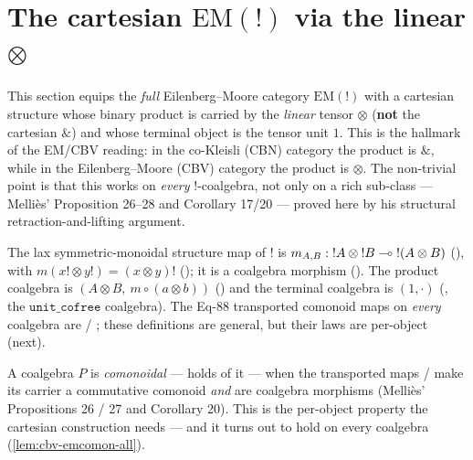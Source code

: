 \section{The cartesian \texorpdfstring{$\mathrm{EM}(\mathord{!})$}{EM(!)} via the linear \texorpdfstring{$\otimes$}{tensor}}\label{sec:cbv-cartesian}

This section equips the \emph{full} Eilenberg--Moore category
$\mathrm{EM}(\mathord{!})$ with a cartesian structure whose binary
product is carried by the \emph{linear} tensor $\otimes$ (\textbf{not} the
cartesian $\mathbin{\&}$) and whose terminal object is the tensor unit
$1$. This is the hallmark of the EM/CBV reading: in the co-Kleisli (CBN)
category the product is $\mathbin{\&}$, while in the Eilenberg--Moore
(CBV) category the product is $\otimes$. The non-trivial point is that
this works on \emph{every} $\mathord{!}$-coalgebra, not only on a rich
sub-class --- Melli\`es' Proposition 26--28 and Corollary 17/20 ---
proved here by his structural retraction-and-lifting argument.

\begin{definition}\label{def:cbv-prod}
\rocqok
{}\rocqok
{}\rocqok
{}
The lax symmetric-monoidal structure map of $\mathord{!}$ is
$m_{A,B} : \mathord{!}A \otimes \mathord{!}B \multimap \mathord{!}(A \otimes B)$
(), with
$m(x! \otimes y!) = (x \otimes y)!$
(); it is a coalgebra morphism
(). The product
coalgebra is $(A \otimes B,\ m \circ (a \otimes b))$
() and the terminal coalgebra is
$(1, \cdot)$ (, the
$\texttt{unit\_cofree}$ coalgebra). The Eq-88 transported comonoid maps
on \emph{every} coalgebra are
 /
; these definitions are general,
but their laws are per-object (next).
\end{definition}

\begin{definition}%
\label{def:cbv-comon}
\rocqok
{}
A coalgebra $P$ is \emph{comonoidal} ---
 holds of it --- when the
transported maps  /
 make its carrier a commutative
comonoid \emph{and} are coalgebra morphisms (Melli\`es' Propositions 26 /
27 and Corollary 20). This is the per-object property the cartesian
construction needs --- and it turns out to hold on every coalgebra
(\autoref{lem:cbv-emcomon-all}).
\end{definition}

